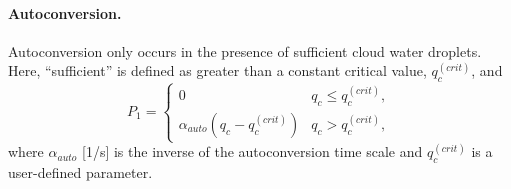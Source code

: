 \paragraph{Autoconversion.} Autoconversion only occurs in the presence of sufficient cloud water droplets.
Here, ``sufficient'' is defined as greater than a constant critical value, $q_c^{(crit)}$, and \cite[eqn.~(12)]{Srivastava1967}
\begin{equation}
  P_1 = \begin{cases}
    0 & q_c \le q_c^{(crit)}, \\
    \alpha_{auto}(q_c - q_c^{(crit)}) & q_c > q_c^{(crit)},
  \end{cases}
\end{equation}
where $\alpha_{auto}$ [1/s] is the inverse of the autoconversion time scale and $q_c^{(crit)}$ is a user-defined parameter.


%
%
%      
%      



